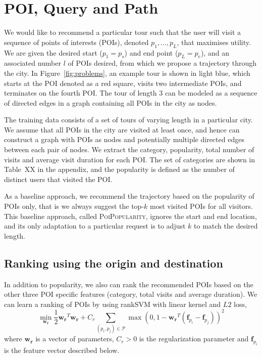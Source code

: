 \section{POI, Query and Path}
\label{sec:method}

We would like to recommend a particular tour such that the user will visit a sequence of points of interests (POIs), denoted $p_1, \ldots, p_L$, that maximises utility. We are given the desired start ($p_1=p_s$) and end point ($p_L=p_e$), and an associated number $l$ of POIs desired, from which we propose a trajectory through the city. In Figure~\ref{fig:problems}, an example tour is shown in light blue, which starts at the POI denoted as a red square, visits two intermediate POIs, and terminates on the fourth POI. The tour of length 3 can be modeled as a sequence of directed edges in a graph containing all POIs in the city as nodes.

The training data consists of a set of tours of varying length in a particular city. We assume that all POIs in the city are visited at least once, and hence can construct a graph with POIs as nodes and potentially multiple directed edges between each pair of nodes. We extract the category, popularity, total number of visits and average visit duration for each POI. The set of categories are shown in Table~XX in the appendix, and the popularity is defined as the number of distinct users that visited the POI.

As a baseline approach, we recommend the trajectory based on the popularity of POIs only, that is we always suggest the top-$k$ most visited POIs for all visitors. This baseline approach, called \textsc{PoiPopularity}, ignores the start and end location, and its only adaptation to a particular request is to adjust $k$ to match the desired length.



\subsection{Ranking using the origin and destination}
\label{sec:ranksvm}

In addition to popularity, we also can rank the recommended POIs based on the other three POI specific features (category, total visits and average duration).
We can learn a ranking of POIs by using rankSVM with linear kernel and $L2$ loss\cite{lranksvm},
\begin{displaymath}
\min_{\mathbf{w_r}} \frac{1}{2} \mathbf{w_r}^T \mathbf{w_r} +
                    C_r \sum_{(p_i, p_j) \in \mathcal{P}}
                    \max \left( 0, 1 - \mathbf{w_r}^T (\mathbf{f}_{p_i} - \mathbf{f}_{p_j}) \right)^2
\end{displaymath}
where $\mathbf{w_r}$ is a vector of parameters,
$C_r > 0$ is the regularization parameter and
$\mathbf{f}_{p_i}$ is the feature vector described below.

